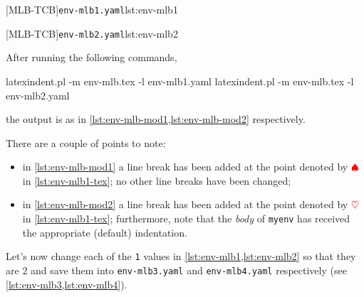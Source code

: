 		\begin{minipage}{.45\textwidth}
			{\texttt{env-mlb1.yaml}}{lst:env-mlb1}
		\end{minipage}
		\hfill
		\begin{minipage}{.45\textwidth}
			{\texttt{env-mlb2.yaml}}{lst:env-mlb2}
		\end{minipage}

		After running the following commands, 
		\begin{commandshell}
latexindent.pl -m env-mlb.tex -l env-mlb1.yaml
latexindent.pl -m env-mlb.tex -l env-mlb2.yaml
\end{commandshell}
		the output is as in \cref{lst:env-mlb-mod1,lst:env-mlb-mod2} respectively.

		\begin{widepage}
			\begin{minipage}{.56\linewidth}
			\end{minipage}
			\hfill
			\begin{minipage}{.43\linewidth}
			\end{minipage}
		\end{widepage}

		There are a couple of points to note:
		\begin{itemize}
			\item in \cref{lst:env-mlb-mod1} a line break has been added at the point denoted by
			      $\color{red}\spadesuit$ in \cref{lst:env-mlb1-tex}; no other line breaks have been
			      changed;
			\item in \cref{lst:env-mlb-mod2} a line break has been added at the point denoted by
			      $\color{red}\heartsuit$ in \cref{lst:env-mlb1-tex}; furthermore, note that the \emph{body}
			      of \texttt{myenv} has received the appropriate (default) indentation.
		\end{itemize}

		Let's now change each of the \texttt{1} values in \cref{lst:env-mlb1,lst:env-mlb2} so
		that they are $2$ and save them into \texttt{env-mlb3.yaml} and \texttt{env-mlb4.yaml}
		respectively (see \cref{lst:env-mlb3,lst:env-mlb4}). 

